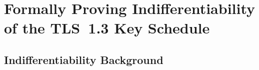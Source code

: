 \section{Formally Proving Indifferentiability of the TLS~1.3 Key Schedule}
\label{app:indiff}

\subsection{Indifferentiability Background}
\label{app:indiff-background}






